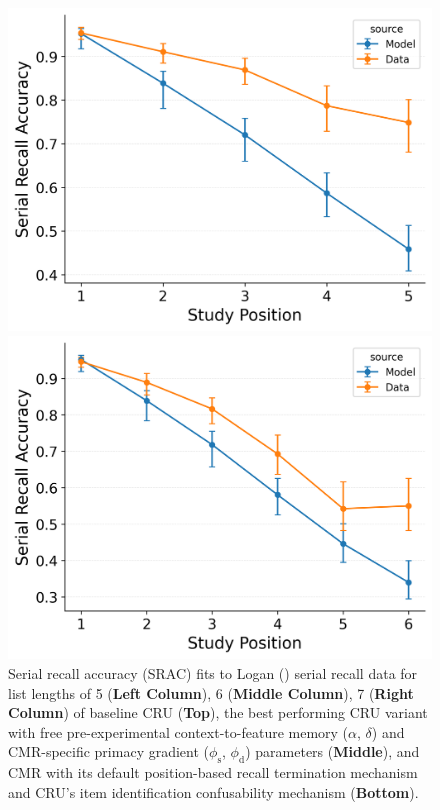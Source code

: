 \documentclass[
  man,
  floatsintext,
  longtable,
  nolmodern,
  notxfonts,
  notimes,
  draftfirst,
  colorlinks=true,linkcolor=blue,citecolor=blue,urlcolor=blue]{apa7}
\begin{document}
\begin{figure}

\caption{\label{fig-serial-srac}Serial recall accuracy (SRAC) fits to
Logan () serial recall data for list
lengths of 5 (\textbf{Left Column}), 6 (\textbf{Middle Column}), 7
(\textbf{Right Column}) of baseline CRU (\textbf{Top}), the best
performing CRU variant with free pre-experimental context-to-feature
memory (\(\alpha\), \(\delta\)) and CMR-specific primacy gradient
(\(\phi_\text{s}\), \(\phi_\text{d}\)) parameters (\textbf{Middle}), and
CMR with its default position-based recall termination mechanism and
CRU's item identification confusability mechanism (\textbf{Bottom}).}

\begin{minipage}{0.33\linewidth}
\includegraphics{figures/Gordon2021_BaseCRU_with_ContextTerm_Confusable_Fitting_srac_LL5.png}\end{minipage}%
%
\begin{minipage}{0.33\linewidth}
\includegraphics{figures/Gordon2021_BaseCRU_with_ContextTerm_Confusable_Fitting_srac_LL6.png}\end{minipage}%

\end{figure}
\end{document}
